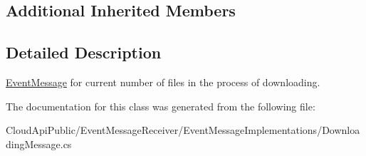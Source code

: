 \subsection*{Additional Inherited Members}


\subsection{Detailed Description}
\hyperlink{class_cloud_api_public_1_1_event_message_receiver_1_1_event_message}{Event\-Message} for current number of files in the process of downloading. 



The documentation for this class was generated from the following file\-:\begin{DoxyCompactItemize}
\item 
Cloud\-Api\-Public/\-Event\-Message\-Receiver/\-Event\-Message\-Implementations/Downloading\-Message.\-cs\end{DoxyCompactItemize}

